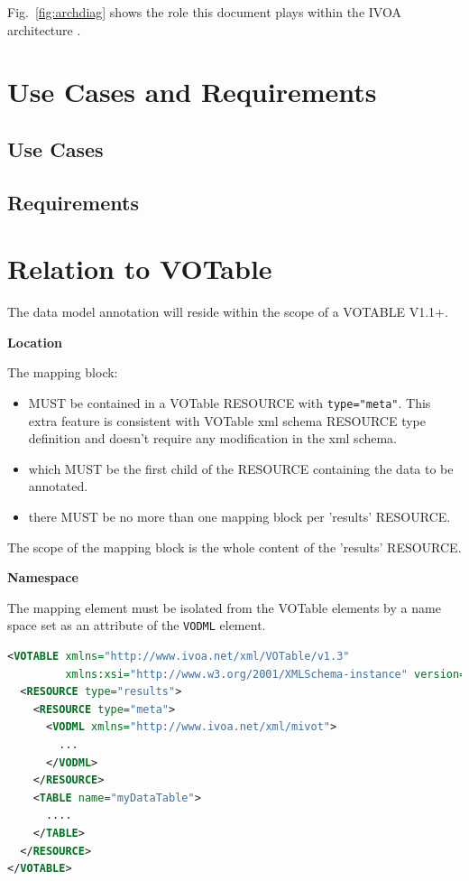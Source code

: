 \documentclass[11pt,a4paper]{ivoa}
\begin{document}
Fig.~\ref{fig:archdiag} shows the role this document plays within
the IVOA architecture \citep{2010ivoa.rept.1123A}.


\pagebreak
\section{Use Cases and Requirements}

\subsection{Use Cases}



\subsection{Requirements}



\lstset{language=XML}

\pagebreak
\section{Relation to VOTable}

The data model annotation will reside within the scope of a VOTABLE V1.1+.


\noindent \textbf{Location}

The mapping block:
\begin{itemize}
\item MUST be contained in a VOTable RESOURCE with \texttt{type="meta"}. 
      This extra feature is consistent with VOTable xml schema RESOURCE type definition and doesn't require any modification in the xml schema.
\item which MUST be the first child of the RESOURCE containing the data to be annotated.
\item there MUST be no more than one mapping block per 'results' RESOURCE.
\end{itemize}

The scope of the mapping block is the whole content of the 'results' RESOURCE. \newline

\noindent \textbf{Namespace}

The mapping element must be isolated from the VOTable elements by a name space set as an attribute of the \texttt{VODML} element.

\begin{lstlisting}[caption={Mapping block in a VOTable},language=XML]
<VOTABLE xmlns="http://www.ivoa.net/xml/VOTable/v1.3" 
         xmlns:xsi="http://www.w3.org/2001/XMLSchema-instance" version="1.3">
  <RESOURCE type="results">
    <RESOURCE type="meta">
      <VODML xmlns="http://www.ivoa.net/xml/mivot">
        ...
      </VODML>
    </RESOURCE>
    <TABLE name="myDataTable">
      ....
    </TABLE>
  </RESOURCE>
</VOTABLE>
\end{lstlisting}
\end{document}

